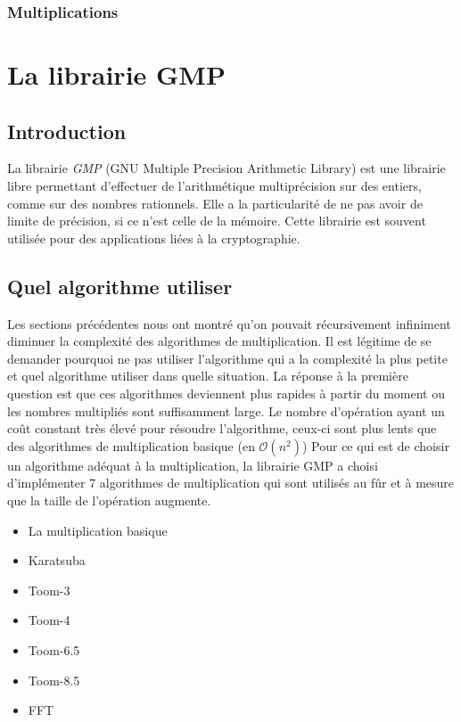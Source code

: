 \documentclass[letterpaper]{article}
\begin{document}
\subsubsection{Multiplications}

\section{La librairie GMP}

\subsection{Introduction}

La librairie \emph{GMP} (GNU Multiple Precision Arithmetic Library) est une
librairie libre permettant d'effectuer de l'arithmétique multiprécision sur
des entiers, comme sur des nombres rationnels. Elle a la particularité de ne pas
avoir de limite de précision, si ce n'est celle de la mémoire.
\newline
Cette librairie est souvent utilisée pour des applications liées à la
cryptographie\cite{wikigmp}.

\subsection{Quel algorithme utiliser}

Les sections précédentes nous ont montré qu'on pouvait récursivement
infiniment diminuer la complexité des algorithmes de multiplication.
Il est légitime de se demander pourquoi ne pas utiliser l'algorithme
qui a la complexité la plus petite et quel algorithme utiliser dans
quelle situation.
\newline
La réponse à la première question est que ces algorithmes deviennent
plus rapides à partir du moment ou les nombres multipliés sont
suffisamment large. Le nombre d'opération ayant un coût constant
très élevé pour résoudre l'algorithme, ceux-ci sont plus lents
que des algorithmes de multiplication basique (en $\mathcal{O}(n^2)$)
\newline
Pour ce qui est de choisir un algorithme adéquat à la multiplication,
la librairie GMP a choisi d'implémenter 7 algorithmes de multiplication
qui sont utilisés au fûr et à mesure que la taille de l'opération
augmente\cite{gmplibmultiplication}.

\begin{itemize}
  \item La multiplication basique
  \item Karatsuba
  \item Toom-3
  \item Toom-4
  \item Toom-6.5
  \item Toom-8.5
  \item FFT
\end{itemize}
\end{document}
